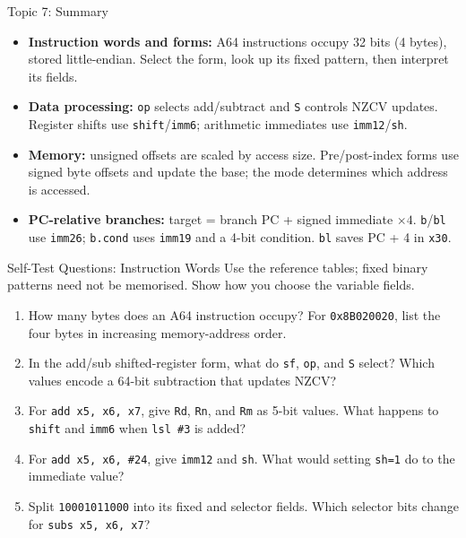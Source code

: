 \documentclass[aspectratio=169,11pt,t]{beamer}
\newcommand{\key}[1]{\textbf{#1}}
\newcommand{\hex}[1]{\texttt{0x#1}}
\newcommand{\code}[1]{\texttt{#1}}
\begin{document}
\begin{frame}{Topic 7: Summary}
\small
{}
\begin{itemize}\setlength{\itemsep}{9pt}
\item \key{Instruction words and forms:} A64 instructions occupy 32 bits (4 bytes), stored little-endian. Select the form, look up its fixed pattern, then interpret its fields.
\item \key{Data processing:} \code{op} selects add/subtract and \code{S} controls NZCV updates. Register shifts use \code{shift}/\code{imm6}; arithmetic immediates use \code{imm12}/\code{sh}.
\item \key{Memory:} unsigned offsets are scaled by access size. Pre/post-index forms use signed byte offsets and update the base; the mode determines which address is accessed.
\item \key{PC-relative branches:} target = branch PC + signed immediate $\times 4$. \code{b}/\code{bl} use \code{imm26}; \code{b.cond} uses \code{imm19} and a 4-bit condition. \code{bl} saves PC + 4 in \code{x30}.
\end{itemize}
\end{frame}


\begin{frame}{Self-Test Questions: Instruction Words}
\small
Use the reference tables; fixed binary patterns need not be memorised. Show how you choose the variable fields.
\begin{enumerate}\setlength{\itemsep}{8pt}
\item How many bytes does an A64 instruction occupy? For \hex{8B020020}, list the four bytes in increasing memory-address order.
\item In the add/sub shifted-register form, what do \code{sf}, \code{op}, and \code{S} select? Which values encode a 64-bit subtraction that updates NZCV?
\item For \code{add x5, x6, x7}, give \code{Rd}, \code{Rn}, and \code{Rm} as 5-bit values. What happens to \code{shift} and \code{imm6} when \code{lsl \#3} is added?
\item For \code{add x5, x6, \#24}, give \code{imm12} and \code{sh}. What would setting \code{sh=1} do to the immediate value?
\item Split \code{10001011000} into its fixed and selector fields. Which selector bits change for \code{subs x5, x6, x7}?
\end{enumerate}
\end{frame}
\end{document}
